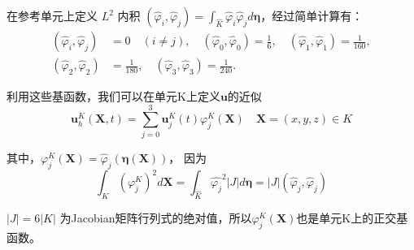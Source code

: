 \documentclass[a4paper, 12pt, UTF8]{ctexart}
\newcommand{\bs}[1]{\boldsymbol{#1}}
\begin{document}
在参考单元上定义 $L^{2}$ 内积 $\left(\hat{\varphi}_{i}, \hat{\varphi}_{j}\right)=\int_{\hat{K}} \hat{\varphi}_{i} \hat{\varphi}_{j} d \bs{\eta}$，经过简单计算有：
\begin{equation}
\begin{split}
\left(\hat{\varphi}_{i}, \hat{\varphi}_{j}\right) &= 0 \quad (i \neq j), \quad 
\left(\hat{\varphi}_{0}, \hat{\varphi}_{0}\right) = \frac{1}{6}, \quad
\left(\hat{\varphi}_{1}, \hat{\varphi}_{1}\right) = \frac{1}{160}, \\
\left(\hat{\varphi}_{2}, \hat{\varphi}_{2}\right) &= \frac{1}{180}, \quad
\left(\hat{\varphi}_{3}, \hat{\varphi}_{3}\right) = \frac{1}{240}.
\end{split}
\end{equation}

利用这些基函数，我们可以在单元K上定义$\bs{u}$的近似
\begin{equation}\label{numericsolution}
\bs u_{h}^K(\boldsymbol{X}, t)=\sum\limits_{j=0}^{3} \bs u_{j}^K(t) \varphi_{j}^K(\boldsymbol{X}) \quad \boldsymbol{X} = (x, y, z) \in K
\end{equation}

其中，$\varphi_{j}^{K}(\boldsymbol{X})=\hat{\varphi}_{j}(\bs{\eta}(\boldsymbol{X}))$，
因为
\begin{equation}\label{othorgnal}
\int_{K}\left(\varphi_{j}^{K}\right)^{2} d\bs{X} = \int_{\hat{K}}\hat{\varphi_{j}}^{2} |J|d\bs{\eta} = |J|\left(\hat{\varphi}_{j}, \hat{\varphi}_{j}\right)
\end{equation}

$|J| = 6|K|$ 为Jacobian矩阵行列式的绝对值，所以$\varphi_{j}^K(\boldsymbol{X})$也是单元K上的正交基函数。
\end{document}
